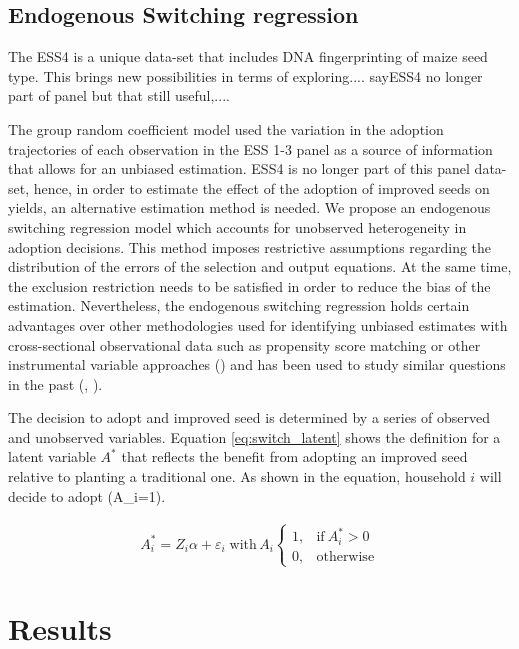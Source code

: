 \documentclass{article}
\begin{document}
\subsection{Endogenous Switching regression}
The ESS4 is a unique data-set that includes DNA fingerprinting of maize seed type. This brings new possibilities in terms of exploring.... sayESS4 no longer part of panel but that still useful,.... \par
The group random coefficient model used the variation in the adoption trajectories of each observation in the ESS 1-3 panel as a source of information that allows for an unbiased estimation. ESS4 is no longer part of this panel data-set, hence, in order to estimate the effect of the adoption of improved seeds on yields, an alternative estimation method is needed. We propose an endogenous switching regression model which accounts for unobserved heterogeneity in adoption decisions. This method imposes restrictive assumptions regarding the distribution of the errors of the selection and output equations. At the same time, the exclusion restriction needs to be satisfied in order to reduce the bias of the estimation. Nevertheless, the endogenous switching regression holds certain advantages over other methodologies used for identifying unbiased estimates with cross-sectional observational data such as propensity score matching or other instrumental variable approaches (\cite{shiferaw2014adoption}) and has been used to study similar questions in the past (\citealt{falco2011does}, \citealt{kabunga2012yield}). \par
The decision to adopt and improved seed is determined by a series of observed and unobserved variables. Equation \ref{eq:switch_latent} shows the definition for a latent variable $A^*$ that reflects the benefit from adopting an improved seed relative to planting a traditional one. As shown in the equation, household $i$ will decide to adopt  (A_i=1). 

\begin{align}
A_i^*=Z_i\alpha+\varepsilon_i \; \text{with} \, A_i    \begin{cases}
      1, & \text{if}\ A_i^*>0 \\
      0, & \text{otherwise}
    \end{cases} \label{eq:switch_latent}
\end{align}


\section{Results}
\end{document}
